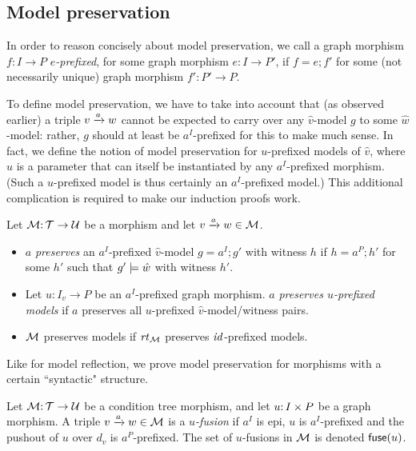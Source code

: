 \subsection{Model preservation}

In order to reason concisely about model preservation, we call a graph morphism $f:I\to P$ \emph{$e$-prefixed}, for some graph morphism $e:I\to P'$, if $f=e;f'$ for some (not necessarily unique) graph morphism $f':P'\to P$.

To define model preservation, we have to take into account that (as observed earlier) a triple ${v}\xrightarrow{a}{w}$ cannot be expected to carry over any $\hat v$-model $g$ to some $\hat w$-model: rather, $g$ should at least be $a^I$-prefixed for this to make much sense. In fact, we define the notion of model preservation for $u$-prefixed models of $\hat v$, where $u$ is a parameter that can itself be instantiated by any $a^I$-prefixed morphism. (Such a $u$-prefixed model is thus certainly an $a^I$-prefixed model.) This additional complication is required to make our induction proofs work.
%
\begin{definition}
Let ${\mathcal{M}}{:}\, {\mathcal{T}}\rightarrow{\mathcal{U}}$ be a morphism and let ${v}\xrightarrow{a}{w}\in{\mathcal{M}}$.
\begin{itemize}[topsep=\smallskipamount]
\item $a$ \emph{preserves} an $a^I$-prefixed $\hat v$-model $g=a^I;g'$ with witness $h$ if $h=a^P;h'$ for some $h'$ such that $g'\models \hat w$ with witness $h'$.
		
\item Let $u:I_v\to P$ be an $a^I$-prefixed graph morphism. $a$ \emph{preserves $u$-prefixed models} if $a$ preserves all $u$-prefixed $\hat v$-model/witness pairs.
		
\item ${\mathcal{M}}$ preserves models if $\mathit{rt}_{{\mathcal{M}}}$ preserves ${\mathit{id}}$-prefixed models.
\end{itemize}
\end{definition}
%
Like for model reflection, we prove model preservation for morphisms with a certain ``syntactic" structure.

\begin{definition}
Let ${\mathcal{M}}{:}\, {\mathcal{T}}\rightarrow{\mathcal{U}}$ be a condition tree morphism, and let $u{:}\, I\times P$ be a graph morphism. A triple ${v}\xrightarrow{a}{w}\in{\mathcal{M}}$ is a \emph{$u$-fusion} if $a^I$ is epi, $u$ is $a^I$-prefixed and the pushout of $u$ over $d_v$ is $a^P$-prefixed. The set of $u$-fusions in ${\mathcal{M}}$ is denoted ${\mathsf{fuse}}(u)$.
\end{definition}

